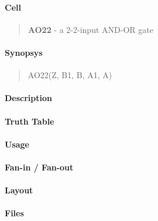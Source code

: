 \label{AO22}
\paragraph{Cell}
\begin{quote}
    \textbf{AO22} - a 2-2-input AND-OR gate
\end{quote}

\paragraph{Synopsys}
\begin{quote}
    AO22(Z, B1, B, A1, A)
\end{quote}

\paragraph{Description}

%

\paragraph{Truth Table}
%

\paragraph{Usage}

\paragraph{Fan-in / Fan-out}

\paragraph{Layout}

\paragraph{Files}

\clearpage
